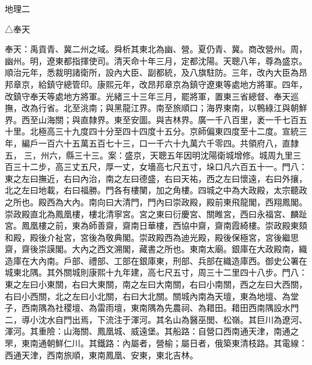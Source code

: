 
\begin{pinyinscope}
地理二

△奉天

奉天：禹貢青、冀二州之域。舜析其東北為幽、營。夏仍青、冀。商改營州。周，幽州。明，遼東都指揮使司。清天命十年三月，定都沈陽。天聰八年，尊為盛京。順治元年，悉裁明諸衛所，設內大臣、副都統，及八旗駐防。三年，改內大臣為昂邦章京，給鎮守總管印。康熙元年，改昂邦章京為鎮守遼東等處地方將軍。四年，改鎮守奉天等處地方將軍。光緒三十三年三月，罷將軍，置東三省總督、奉天巡撫，改為行省。北至洮南；與黑龍江界。南至旅順口；海界東南，以鴨綠江與朝鮮界。西至山海關；與直隸界。東至安圖。與吉林界。廣一千八百里，袤一千七百五十里。北極高三十九度四十分至四十四度十五分。京師偏東四度至十二度。宣統三年，編戶一百六十五萬五百七十三，口一千六十九萬六千零四。共領府八，直隸五，三，州六，縣三十三。案：盛京，天聰五年因明沈陽衛城增修。城周九里三百三十二步，高三丈五尺，厚一丈，女墻高七尺五寸，垛口凡六百五十一。門八：東之左曰撫近，右曰內治，南之左曰德盛，右曰天祐，西之左曰懷遠，右曰外攘，北之左曰地載，右曰福勝。門各有樓闉，加之角樓。四城之中為大政殿，太宗聽政之所也。殿西為大內。南向曰大清門，門內曰崇政殿，殿前東飛龍閣，西翔鳳閣。崇政殿直北為鳳凰樓，樓北清寧宮。宮之東曰衍慶宮、關睢宮，西曰永福宮、麟趾宮。鳳凰樓之前，東為師善齋，齋南日華樓，西協中齋，齋南霞綺樓。崇政殿東頦和殿，殿後介祉宮，宮後為敬典閣。崇政殿西為迪光殿，殿後保極宮，宮後繼思齋，齋後崇謨閣。大內之西文溯閣，藏書之所也。東南太廟。銀庫在大政殿南，織造庫在大內南。戶部、禮部、工部在銀庫東，刑部、兵部在織造庫西。御史公署在城東北隅。其外關城則康熙十九年建，高七尺五寸，周三十二里四十八步。門八：東之左曰小東關，右曰大東關，南之左曰大南關，右曰小南關，西之左曰大西關，右曰小西關，北之左曰小北關，右曰大北關。關城內南為天壇，東為地壇、為堂子，西南隅為社稷壇、為雷雨壇，東南隅為先農祠、為耤田。耤田西南隅設水門二，導小沈水自門出焉，下流注于渾河。其名山為醫巫閭、松嶺。其巨川為遼河、渾河。其重險：山海關、鳳凰城、威遠堡。其船路：自營口西南通天津，南通之罘，東南通朝鮮仁川。其鐵路：內屬者，營榆；屬日者，俄築東清枝路。其電線：西通天津，西南旅順，東南鳳凰、安東，東北吉林。


\end{pinyinscope}
